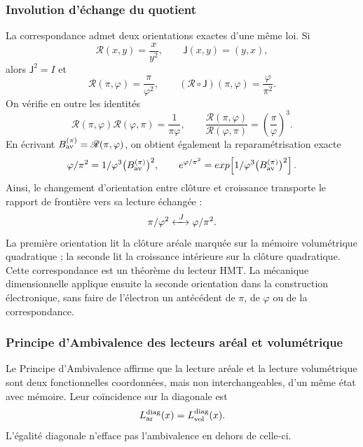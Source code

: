 \subsubsection{Involution d'échange du quotient}
\label{sec:espejo-pi-phi-electron-hmt}

La correspondance admet deux orientations exactes d'une même loi. Si
\[
 \mathscr R(x,y)=\frac{x}{y^2},
 \qquad
 \mathsf J(x,y)=(y,x),
\]
alors \(\mathsf J^2=I\) et
\[
 \mathscr R(\pi,\varphi)=\frac{\pi}{\varphi^2},
 \qquad
 (\mathscr R\circ\mathsf J)(\pi,\varphi)
 =\frac{\varphi}{\pi^2}.
\]
On vérifie en outre les identités
\[
 \mathscr R(\pi,\varphi)\mathscr R(\varphi,\pi)
 =\frac1{\pi\varphi},
 \qquad
 \frac{\mathscr R(\pi,\varphi)}
 {\mathscr R(\varphi,\pi)}
 =\left(\frac{\pi}{\varphi}\right)^3.
\]
En écrivant
\(\mathcal B_{\rm av}^{(\pi)}=\mathscr R(\pi,\varphi)\), on obtient
également la reparamétrisation exacte
\[
 \frac{\varphi}{\pi^2}
 =
 \frac1{\varphi^3
 \bigl(\mathcal B_{\rm av}^{(\pi)}\bigr)^2},
 \qquad
 e^{\varphi/\pi^2}
 =
 \exp\!\left[
 \frac1{\varphi^3
 \bigl(\mathcal B_{\rm av}^{(\pi)}\bigr)^2}
 \right].
\]
Ainsi, le changement d'orientation entre clôture et croissance transporte le
rapport de frontière vers sa lecture échangée :
\[
 \frac{\pi}{\varphi^2}
 \xleftrightarrow{\ \mathsf J\ }
 \frac{\varphi}{\pi^2}.
\]
La première orientation lit la clôture aréale marquée sur la mémoire
volumétrique quadratique ; la seconde lit la croissance intérieure sur la
clôture quadratique. Cette correspondance est un théorème du lecteur HMT. La
mécanique dimensionnelle applique ensuite la seconde orientation dans la
construction électronique, sans faire de l'électron un antécédent de
\(\pi\), de \(\varphi\) ou de la correspondance.

\subsubsection{Principe d'Ambivalence des lecteurs aréal et volumétrique}
\label{sec:ambivalencia-grav-inercial-pi-phi2}

Le Principe d'Ambivalence affirme que la lecture aréale et la lecture
volumétrique sont deux fonctionnelles coordonnées, mais non interchangeables, d'un
même état avec mémoire. Leur coïncidence sur la diagonale est
\[
 \mathcal L_{\rm ar}^{\rm diag}(x)
 =\mathcal L_{\rm vol}^{\rm diag}(x).
\]
L'égalité diagonale n'efface pas l'ambivalence en dehors de celle-ci.

